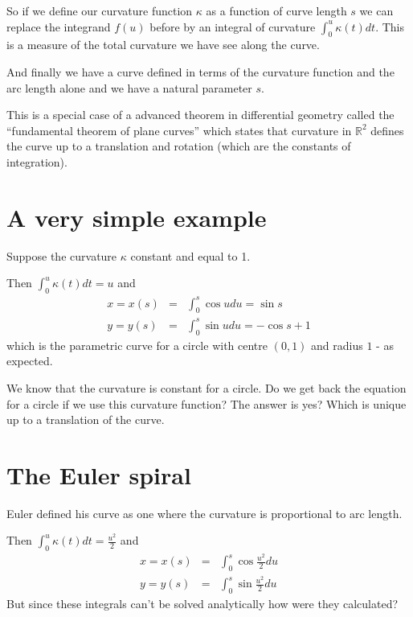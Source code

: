 \documentclass[]{article} %
\theoremstyle{definition}
\theoremstyle{theorem}
\begin{document}
So if we define our curvature function $\kappa$ as a function of curve length $s$ we can replace the integrand $f(u)$ before by an integral of curvature $\int_{0}^{u} \kappa(t) dt$. This is a measure of the total curvature we have see along the curve.

And finally we have a curve defined in terms of the curvature function and the arc length alone and we have a natural parameter $s$.

This is a special case of a advanced theorem in differential geometry called the ``fundamental theorem of plane curves'' which states that curvature in $\mathbb{R}^2$ defines the curve up to a translation and rotation (which are the constants of integration).


\section{A very simple example}
\begin{tcolorbox}
	Suppose the curvature $\kappa$ constant and equal to 1. 
	
	Then 
	$ \int_0^u \kappa(t) dt = u $ and
	\begin{eqnarray*}
		x = x(s) &=& \int_{0}^{s} \cos u du = \sin s\\
		y = y(s) &=& \int_{0}^{s} \sin u du = - \cos s + 1
	\end{eqnarray*}
	which is the parametric curve for a circle with centre $(0, 1)$ and radius $1$ - as expected.
\end{tcolorbox}

We know that the curvature is constant for a circle. Do we get back the equation for a circle if we use this curvature function? The answer is yes? Which is unique up to a translation of the curve.


\section{The Euler spiral}
\begin{tcolorbox}
	Euler defined his curve as one where the curvature is proportional to arc length.
	
	\begin{center}
	\end{center}
	Then 
	$ \int_0^u \kappa(t) dt = \frac{u^2}{2} $ and
	\begin{eqnarray*}
		x = x(s) &=& \int_{0}^{s} \cos \frac{u^2}{2} du\\
		y = y(s) &=& \int_{0}^{s} \sin \frac{u^2}{2} du
	\end{eqnarray*}
	But since these integrals can't be solved analytically how were they calculated?
\end{tcolorbox}
\end{document}
